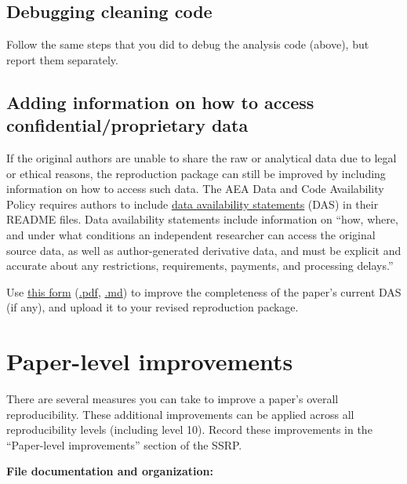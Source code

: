 \documentclass[
  openany]{book}
\begin{document}
\hypertarget{debugging-cleaning-code}{%
\subsection{Debugging cleaning code}\label{debugging-cleaning-code}}

Follow the same steps that you did to debug the analysis code (above), but report them separately.

\hypertarget{adding-info-admin}{%
\subsection{Adding information on how to access confidential/proprietary data}\label{adding-info-admin}}

If the original authors are unable to share the raw or analytical data due to legal or ethical reasons, the reproduction package can still be improved by including information on how to access such data. The AEA Data and Code Availability Policy requires authors to include \href{https://www.aeaweb.org/journals/data/data-code-policy\#statement}{data availability statements} (DAS) in their README files. Data availability statements include information on ``how, where, and under what conditions an independent researcher can access the original source data, as well as author-generated derivative data, and must be explicit and accurate about any restrictions, requirements, payments, and processing delays.''

Use \href{sample-DAS.html}{this form} (\href{sample-DAS.pdf}{.pdf}, \href{https://github.com/BITSS/ACRE/blob/master/sample-DAS.md}{.md}) to improve the completeness of the paper's current DAS (if any), and upload it to your revised reproduction package.

\hypertarget{paper-level}{%
\section{Paper-level improvements}\label{paper-level}}

There are several measures you can take to improve a paper's overall reproducibility. These additional improvements can be applied across all reproducibility levels (including level 10). Record these improvements in the ``Paper-level improvements'' section of the SSRP.

\textbf{File documentation and organization: }
\end{document}

